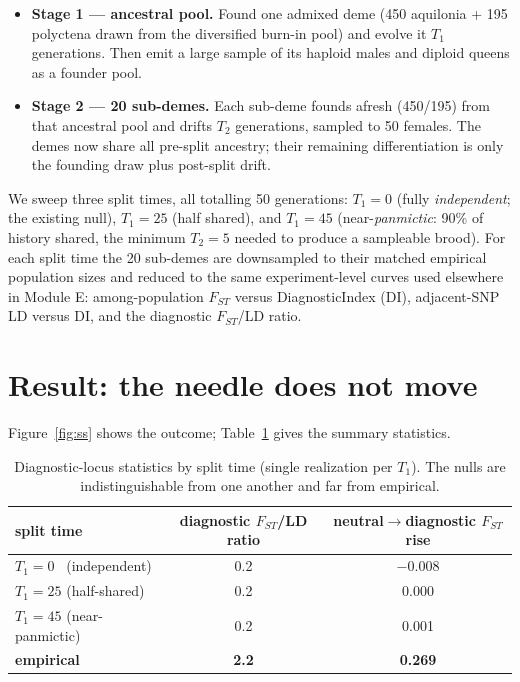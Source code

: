 \documentclass[11pt,a4paper]{article}
\begin{document}
\begin{itemize}\itemsep2pt
  \item \textbf{Stage 1 --- ancestral pool.} Found one admixed deme (450 aquilonia
  + 195 polyctena drawn from the diversified burn-in pool) and evolve it $T_1$
  generations. Then emit a large sample of its haploid males and diploid queens as a
  founder pool.
  \item \textbf{Stage 2 --- 20 sub-demes.} Each sub-deme founds afresh (450/195) from
  that ancestral pool and drifts $T_2$ generations, sampled to 50 females. The demes
  now share all pre-split ancestry; their remaining differentiation is only the
  founding draw plus post-split drift.
\end{itemize}

We sweep three split times, all totalling 50 generations:
$T_1=0$ (fully \emph{independent}; the existing null), $T_1=25$ (half shared), and
$T_1=45$ (near-\emph{panmictic}: 90\% of history shared, the minimum $T_2=5$ needed to
produce a sampleable brood). For each split time the 20 sub-demes are downsampled to
their matched empirical population sizes and reduced to the same experiment-level
curves used elsewhere in Module E: among-population $F_{ST}$ versus DiagnosticIndex
(DI), adjacent-SNP LD versus DI, and the diagnostic $F_{ST}$/LD ratio.

\section*{Result: the needle does not move}
Figure~\ref{fig:ss} shows the outcome; Table~\ref{tab:ss} gives the summary
statistics.

\begin{table}[h]\centering
\caption{Diagnostic-locus statistics by split time (single realization per $T_1$).
The nulls are indistinguishable from one another and far from empirical.}
\label{tab:ss}
\begin{tabular}{lcc}
\toprule
split time & diagnostic $F_{ST}$/LD ratio & neutral$\rightarrow$diagnostic $F_{ST}$ rise \\
\midrule
$T_1=0$ \ (independent)      & 0.2 & $-0.008$ \\
$T_1=25$ (half-shared)       & 0.2 & \phantom{$-$}0.000 \\
$T_1=45$ (near-panmictic)    & 0.2 & \phantom{$-$}0.001 \\
\textbf{empirical}           & \textbf{2.2} & \textbf{0.269} \\
\bottomrule
\end{tabular}
\end{table}
\end{document}
